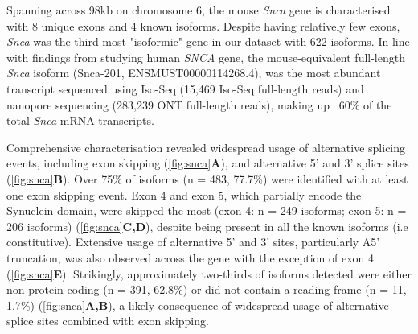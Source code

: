 Spanning across 98kb on chromosome 6, the mouse \textit{Snca} gene is characterised with 8 unique exons and 4 known isoforms. Despite having relatively few exons, \textit{Snca} was the third most "isoformic" gene in our dataset with 622 isoforms. In line with findings from studying human \textit{SNCA} gene\cite{Tseng2019}, the mouse-equivalent full-length \textit{Snca} isoform (Snca-201, ENSMUST00000114268.4), was the most abundant transcript sequenced using Iso-Seq (15,469 Iso-Seq full-length reads) and nanopore sequencing (283,239 ONT full-length reads), making up ~60\% of the total \textit{Snca} mRNA transcripts. 

Comprehensive characterisation revealed widespread usage of alternative splicing events, including exon skipping (\cref{fig:snca}\textbf{A}), and alternative 5' and 3' splice sites (\cref{fig:snca}\textbf{B}). Over 75\% of isoforms (n  = 483, 77.7\%) were identified with at least one exon skipping event. Exon 4 and exon 5, which partially encode the Synuclein domain, were skipped the most (exon 4: n = 249 isoforms; exon 5: n = 206 isoforms) (\cref{fig:snca}\textbf{C,D}), despite being present in all the known isoforms (i.e constitutive). Extensive usage of alternative 5' and 3' sites, particularly A5' truncation, was also observed across the gene with the exception of exon 4 (\cref{fig:snca}\textbf{E}). Strikingly, approximately two-thirds of isoforms detected were either non protein-coding (n = 391, 62.8\%) or did not contain a reading frame (n = 11, 1.7\%) (\cref{fig:snca}\textbf{A,B}), a likely consequence of widespread usage of alternative splice sites combined with exon skipping. 

